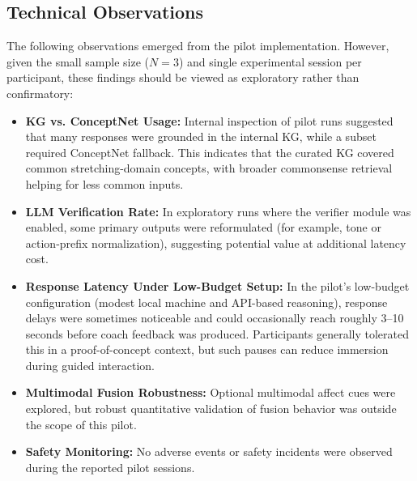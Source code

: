\documentclass[pdflatex,sn-basic,Numbered,iicol,twocolumn]{sn-jnl}%
\begin{document}
\subsection{Technical Observations}

The following observations emerged from the pilot implementation. However, given the small sample size ($N=3$) and single experimental session per participant, these findings should be viewed as exploratory rather than confirmatory:

\begin{itemize}
\item \textbf{KG vs. ConceptNet Usage:} Internal inspection of pilot runs suggested that many responses were grounded in the internal KG, while a subset required ConceptNet fallback. This indicates that the curated KG covered common stretching-domain concepts, with broader commonsense retrieval helping for less common inputs.

\item \textbf{LLM Verification Rate:} In exploratory runs where the verifier module was enabled, some primary outputs were reformulated (for example, tone or action-prefix normalization), suggesting potential value at additional latency cost.

\item \textbf{Response Latency Under Low-Budget Setup:} In the pilot's low-budget configuration (modest local machine and API-based reasoning), response delays were sometimes noticeable and could occasionally reach roughly 3--10 seconds before coach feedback was produced. Participants generally tolerated this in a proof-of-concept context, but such pauses can reduce immersion during guided interaction.

\item \textbf{Multimodal Fusion Robustness:} Optional multimodal affect cues were explored, but robust quantitative validation of fusion behavior was outside the scope of this pilot.

\item \textbf{Safety Monitoring:} No adverse events or safety incidents were observed during the reported pilot sessions.
\end{itemize}
\end{document}
